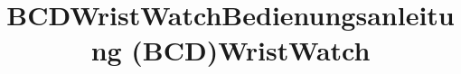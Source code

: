 \documentclass[12pt,a4paper,final]{article}
\title{BCDWristWatch}
\date{\vspace{-10ex}}
\begin{document}
\title{Bedienungsanleitung (BCD)WristWatch}
\author{}
\maketitle
\vspace{5cm}
\begin{center}
\end{center}
\newpage


\end{document}
